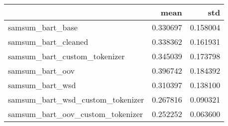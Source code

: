 \begin{tabular}{lrr}
\toprule
 & mean & std \\
\midrule
samsum_bart_base & 0.330697 & 0.158004 \\
samsum_bart_cleaned & 0.338362 & 0.161931 \\
samsum_bart_custom_tokenizer & 0.345039 & 0.173798 \\
samsum_bart_oov & 0.396742 & 0.184392 \\
samsum_bart_wsd & 0.310397 & 0.138100 \\
samsum_bart_wsd_custom_tokenizer & 0.267816 & 0.090321 \\
samsum_bart_oov_custom_tokenizer & 0.252252 & 0.063600 \\
\bottomrule
\end{tabular}
